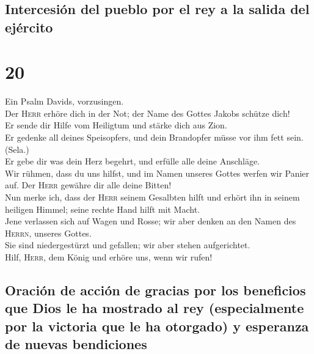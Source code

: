 \hypertarget{intercesiuxf3n-del-pueblo-por-el-rey-a-la-salida-del-ejuxe9rcito}{%
\subsection{Intercesión del pueblo por el rey a la salida del
ejército}\label{intercesiuxf3n-del-pueblo-por-el-rey-a-la-salida-del-ejuxe9rcito}}

\hypertarget{section-19}{%
\section{20}\label{section-19}}

 Ein Psalm Davids, vorzusingen.\\
 Der \textsc{Herr} erhöre dich in der Not; der Name des
Gottes Jakobs schütze dich!\\
 Er sende dir Hilfe vom Heiligtum und stärke dich aus
Zion.\\
 Er gedenke all deines Speisopfers, und dein Brandopfer
müsse vor ihm fett sein. (Sela.)\\
 Er gebe dir was dein Herz begehrt, und erfülle alle deine
Anschläge.\\
 Wir rühmen, dass du uns hilfst, und im Namen unseres
Gottes werfen wir Panier auf. Der \textsc{Herr} gewähre dir alle deine
Bitten!\\
 Nun merke ich, dass der \textsc{Herr} seinem Gesalbten
hilft und erhört ihn in seinem heiligen Himmel; seine rechte Hand hilft
mit Macht.\\
 Jene verlassen sich auf Wagen und Rosse; wir aber denken
an den Namen des \textsc{Herrn}, unseres Gottes.\\
 Sie sind niedergestürzt und gefallen; wir aber stehen
aufgerichtet.\\
 Hilf, \textsc{Herr}, dem König und erhöre uns, wenn wir
rufen!

\hypertarget{oraciuxf3n-de-acciuxf3n-de-gracias-por-los-beneficios-que-dios-le-ha-mostrado-al-rey-especialmente-por-la-victoria-que-le-ha-otorgado-y-esperanza-de-nuevas-bendiciones}{%
\subsection{Oración de acción de gracias por los beneficios que Dios le
ha mostrado al rey (especialmente por la victoria que le ha otorgado) y
esperanza de nuevas
bendiciones}\label{oraciuxf3n-de-acciuxf3n-de-gracias-por-los-beneficios-que-dios-le-ha-mostrado-al-rey-especialmente-por-la-victoria-que-le-ha-otorgado-y-esperanza-de-nuevas-bendiciones}}

